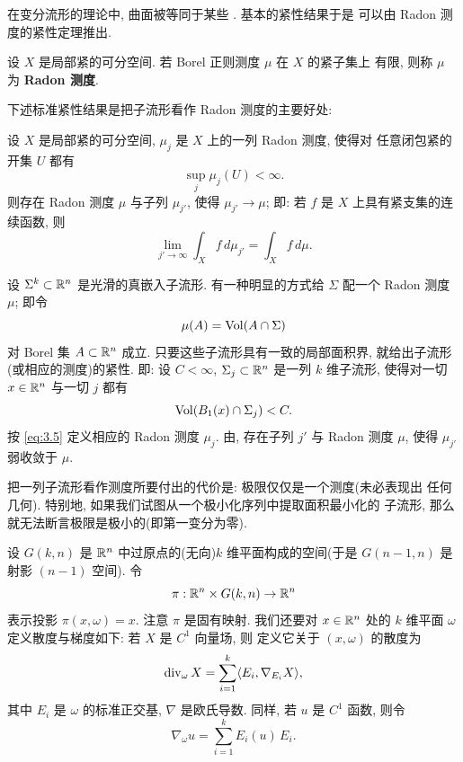 在变分流形的理论中, 曲面被等同于某些 . 基本的紧性结果于是
可以由 Radon 测度的紧性定理推出.

\begin{definition}
\label{def:3.1}
设 $X$ 是局部紧的可分空间. 若 Borel 正则测度 $\mu$ 在 $X$ 的紧子集上
有限, 则称 $\mu$ 为 \textbf{Radon 测度}.
\end{definition}

下述标准紧性结果是把子流形看作 Radon 测度的主要好处:

\begin{theorem}
\label{thm:3.2}
设 $X$ 是局部紧的可分空间, $\mu_j$ 是 $X$ 上的一列 Radon 测度, 使得对
任意闭包紧的开集 $U$ 都有
\begin{equation}
\sup_j\mu_j(U)<\infty.
\label{eq:3.3}
\end{equation}
则存在 Radon 测度 $\mu$ 与子列 $\mu_{j'}$, 使得 $\mu_{j'}\to\mu$; 即:
若 $f$ 是 $X$ 上具有紧支集的连续函数, 则
\begin{equation}
\lim_{j'\to\infty}\int_X f\,d\mu_{j'}=\int_X f\,d\mu.
\label{eq:3.4}
\end{equation}
\end{theorem}

设 $\Sigma^k\subset\mathbb{R}^n$ 是光滑的真嵌入子流形. 有一种明显的方式给
$\Sigma$ 配一个 Radon 测度 $\mu$; 即令
\begin{equation}
\mu(A)=\operatorname{Vol}(A\cap\Sigma)
\label{eq:3.5}
\end{equation}
对 Borel 集 $A\subset\mathbb{R}^n$ 成立. 只要这些子流形具有一致的局部面积界,
 就给出子流形(或相应的测度)的紧性. 即: 设 $C<\infty$,
$\Sigma_j\subset\mathbb{R}^n$ 是一列 $k$ 维子流形, 使得对一切 $x\in\mathbb{R}^n$ 与一切
$j$ 都有
\begin{equation}
\operatorname{Vol}(B_1(x)\cap\Sigma_j)<C.
\label{eq:3.6}
\end{equation}
按 \eqref{eq:3.5} 定义相应的 Radon 测度 $\mu_j$. 由, 存在子列 $j'$ 与
Radon 测度 $\mu$, 使得 $\mu_{j'}$ 弱收敛于 $\mu$.

把一列子流形看作测度所要付出的代价是: 极限仅仅是一个测度(未必表现出
任何几何). 特别地, 如果我们试图从一个极小化序列中提取面积最小化的
子流形, 那么就无法断言极限是极小的(即第一变分为零).

设 $G(k,n)$ 是 $\mathbb{R}^n$ 中过原点的(无向)$k$ 维平面构成的空间(于是
$G(n-1,n)$ 是射影 $(n-1)$ 空间). 令
\begin{equation}
\pi:\mathbb{R}^n\times G(k,n)\to\mathbb{R}^n
\label{eq:3.7}
\end{equation}
表示投影 $\pi(x,\omega)=x$. 注意 $\pi$ 是固有映射. 我们还要对 $x\in\mathbb{R}^n$
处的 $k$ 维平面 $\omega$ 定义散度与梯度如下: 若 $X$ 是 $C^1$ 向量场, 则
定义它关于 $(x,\omega)$ 的散度为
\begin{equation}
\operatorname{div}_\omega X=\sum_{i=1}^k\langle E_i,\nabla_{E_i}X\rangle,
\label{eq:3.8}
\end{equation}
其中 $E_i$ 是 $\omega$ 的标准正交基, $\nabla$ 是欧氏导数. 同样, 若 $u$ 是
$C^1$ 函数, 则令
\begin{equation}
\nabla_\omega u=\sum_{i=1}^k E_i(u)\,E_i.
\label{eq:3.9}
\end{equation}


